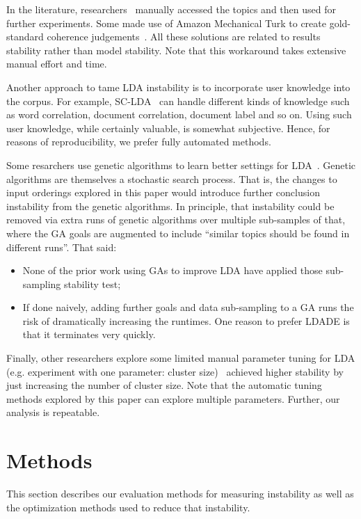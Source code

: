 \documentclass[twocolumn,5p,sort&compress]{elsarticle}
\newcommand{\bi}{\begin{itemize}}
\newcommand{\ei}{\end{itemize}}
\theoremstyle{break}
\begin{document}
In the literature, researchers~\cite{maskeri2008mining, martin2015app, guzman2014users}
    manually accessed the topics and then used for further experiments. Some
    made use of Amazon Mechanical Turk to create gold-standard coherence
    judgements~\cite{lau2014machine}. All these solutions are related to results
    stability rather than model stability.
    Note that this workaround takes extensive manual effort and time.

    
    Another approach to tame LDA instability
    is to incorporate
    user knowledge into the corpus. For example,
    SC-LDA~\cite{yang2015improving} can
    handle different kinds of knowledge such as word correlation,
    document correlation, document label and so on. Using such user
    knowledge, while certainly valuable, is somewhat subjective.
    Hence, for reasons of reproducibility, we prefer fully
    automated methods.

Some resarchers 
use
genetic
algorithms to learn better settings for LDA~\cite{panichella2013effectively,lohar2013improving,sun2015msr4sm}.
Genetic algorithms are 
themselves a stochastic search process. That is, the changes to 
input orderings explored in this paper would introduce further conclusion instability
from the genetic algorithms.
In principle, that instability could be removed via extra  runs of genetic algorithms 
over multiple sub-samples of that, where the GA goals are augmented to include
``similar topics should be found in different runs''.
That said:
\bi
\item None of the prior work using GAs to improve LDA have applied those sub-sampling stability test;
\item If done naively, adding further goals and data sub-sampling to a GA runs the risk
  of dramatically increasing the runtimes.
One reason to prefer LDADE is that it terminates very quickly.
\ei
Finally, other researchers explore
some limited manual parameter tuning for LDA
(e.g. experiment with one parameter: cluster size)~\cite{galvis2013analysis, tian2009using}
achieved higher stability by just increasing the number of cluster size.
Note that the automatic tuning methods explored by this paper can
explore multiple parameters. Further, our analysis is repeatable.

\section{Methods}
\label{sect:evaluation}
This section describes our evaluation methods for measuring instability as well as the optimization
methods used to reduce that instability.
\end{document}
